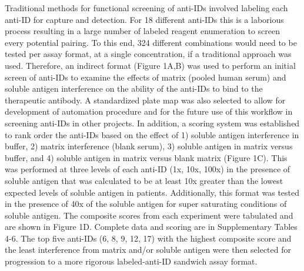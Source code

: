 Traditional methods for functional screening of anti-IDs involved labeling each anti-ID for capture and detection.  For 18 different anti-IDs this is a laborious process resulting in a large number of labeled reagent enumeration to screen every potential pairing.  To this end, 324 different combinations would need to be tested per assay format, at a single concentration, if a traditional approach was used.  Therefore, an indirect format (Figure 1A,B) was used to perform an initial screen of anti-IDs to examine the effects of matrix (pooled human serum) and soluble antigen interference on the ability of the anti-IDs to bind to the therapeutic antibody.  A standardized plate map was also selected to allow for development of automation procedure and for the future use of this workflow in screening anti-IDs in other projects.  In addition, a scoring system was established to rank order the anti-IDs based on the effect of 1) soluble antigen interference in buffer, 2) matrix interference (blank serum), 3) soluble antigen in matrix versus buffer, and 4) soluble antigen in matrix versus blank matrix (Figure 1C).  This was performed at three levels of each anti-ID (1x, 10x, 100x) in the presence of soluble antigen that was calculated to be at least 10x greater than the lowest expected levels of soluble antigen in patients.  Additionally, this format was tested in the presence of 40x of the soluble antigen for super saturating conditions of soluble antigen.  The composite scores from each experiment were tabulated and are shown in Figure 1D. Complete data and scoring are in Supplementary Tables 4-6.  The top five anti-IDs (6, 8, 9, 12, 17) with the highest composite score and the least interference from matrix and/or soluble antigen were then selected for progression to a more rigorous labeled-anti-ID sandwich assay format. 


